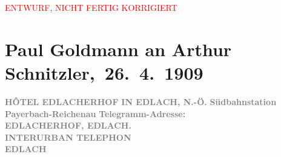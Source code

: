 
\begin{center}
            \textcolor{red}{ENTWURF, NICHT FERTIG KORRIGIERT}
                      \end{center}
            
         
         \renewcommand{\erwaehntePersonen}{Personen: Lili Cappellini, Eva Marie Goldmann, Rudolf Lothar, Olga Schnitzler, Heinrich Schnitzler}
         \renewcommand{\erwaehnteInstitutionen}{Institutionen: k. k. Post- und Telegraphenverwaltung}
         \renewcommand{\erwaehnteOrte}{Orte: Bahnhof Payerbach-Reichenau, Berlin, Deutsches Theater Berlin, Edlach, Hotel Edlacherhof, Niederösterreich, Semmering, Wien}
         \renewcommand{\erwaehnteWerke}{Werke: Faust bei Reinhardt, Faust. Eine Tragödie, Pester Lloyd}
               \section[ Paul Goldmann an Arthur Schnitzler, 26. 4. 1909]{ Paul Goldmann an Arthur Schnitzler, 26. 4. 1909}\nopagebreak{}\rehead{ }\begin{ledgroupsized}[t]{13cm}\normalsize\beginnumbering \toendnotes[C]{\smallbreak\pagebreak[2]} 
\toendnotes[C]{\smallbreak}\pstart
           \noindent{}{\pb}\textcolor{gray}{\textbf{HÔTEL EDLACHERHOF}}\pend
           \pstart
           \raggedleft{}\textcolor{gray}{\textbf{IN EDLACH, N.-Ö.}}\pend
           \pstart
           \noindent{}\raggedleft{}\textcolor{gray}{\textbf{\textbf{Südbahnstation Payerbach-Reichenau}}}\pend
           \pstart
           \noindent{}\textcolor{gray}{\textbf{Telegramm-Adresse:}}{\\}\textcolor{gray}{\textbf{\textbf{EDLACHERHOF, EDLACH.}}}{\\}\textcolor{gray}{\textbf{INTERURBAN TELEPHON}}{\\}\textcolor{gray}{\textbf{\textbf{EDLACH
}}}
\end{ledgroupsized}
